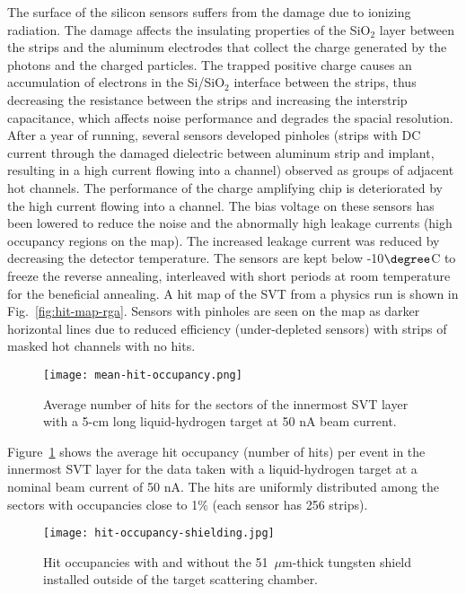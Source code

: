 The surface of the silicon sensors suffers from the damage due to ionizing radiation. The damage affects the insulating properties of the SiO$_2$ layer between the strips and the aluminum electrodes that collect the charge generated by the photons and the charged particles. The trapped positive charge causes an accumulation of electrons in the Si/SiO$_2$ interface between the strips, thus decreasing the resistance between the strips and increasing the interstrip capacitance, which affects noise performance and degrades the spacial resolution. After a year of running, several sensors developed pinholes (strips with DC current through the damaged dielectric between aluminum strip and implant, resulting in a high current flowing into a channel) observed as groups of adjacent hot channels. The performance of the charge amplifying chip is deteriorated by the high current flowing into a channel. The bias voltage on these sensors has been lowered to reduce the noise and the abnormally high leakage currents (high occupancy regions on the map). The increased leakage current was reduced by decreasing the detector temperature. The sensors are kept below -10$\degree$C to freeze the reverse annealing, interleaved with short periods at room temperature for the beneficial annealing. A hit map of the SVT from a physics run is shown in Fig.~\ref{fig:hit-map-rga}. Sensors with pinholes are seen on the map as darker horizontal lines due to reduced efficiency (under-depleted sensors) with strips of masked hot channels with no hits. 

\begin{figure}[hbt] 
\centering 
\texttt{[image: mean-hit-occupancy.png]}
\caption{Average number of hits for the sectors of the innermost SVT layer with a 5-cm long liquid-hydrogen target at 50 nA beam current.}
\label{fig:mean-hit-occupancy}
\end{figure}

Figure~\ref{fig:mean-hit-occupancy} shows the average hit occupancy (number of hits) per event in the innermost SVT layer for the data taken with a liquid-hydrogen target at a nominal beam current of 50 nA. The hits are uniformly distributed among the sectors with occupancies close to 1$\%$ (each sensor has 256 strips).

\begin{figure}[hbt] 
\centering 
\texttt{[image: hit-occupancy-shielding.jpg]}
\caption{Hit occupancies with and without the 51~$\mu$m-thick tungsten shield installed outside of the target scattering chamber.}
\label{fig:hit-occupancy-shielding}
\end{figure}

